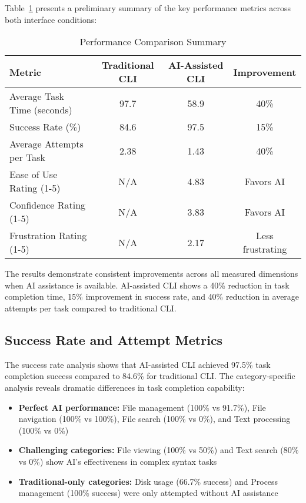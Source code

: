 Table~\ref{tab:results_summary} presents a preliminary summary of the key performance metrics across both interface conditions:

\begin{table}[h]
	\centering
	\caption{Performance Comparison Summary}
	\label{tab:results_summary}
	\begin{tabular}{|l|c|c|c|}
		\hline
		\textbf{Metric}             & \textbf{Traditional CLI} & \textbf{AI-Assisted CLI} & \textbf{Improvement} \\
		\hline
		Average Task Time (seconds) & 97.7                     & 58.9                     & 40\%                 \\
		\hline
		Success Rate (\%)           & 84.6                     & 97.5                     & 15\%                 \\
		\hline
		Average Attempts per Task   & 2.38                     & 1.43                     & 40\%                 \\
		\hline
		Ease of Use Rating (1-5)    & N/A                      & 4.83                     & Favors AI            \\
		\hline
		Confidence Rating (1-5)     & N/A                      & 3.83                     & Favors AI            \\
		\hline
		Frustration Rating (1-5)    & N/A                      & 2.17                     & Less frustrating     \\
		\hline
	\end{tabular}
\end{table}

The results demonstrate consistent improvements across all measured dimensions when AI assistance is available. AI-assisted CLI shows a 40\% reduction in task completion time, 15\% improvement in success rate, and 40\% reduction in average attempts per task compared to traditional CLI.

\subsection{Success Rate and Attempt Metrics}

The success rate analysis shows that AI-assisted CLI achieved 97.5\% task completion success compared to 84.6\% for traditional CLI. The category-specific analysis reveals dramatic differences in task completion capability:

\begin{itemize}
	\item \textbf{Perfect AI performance:} File management (100\% vs 91.7\%), File navigation (100\% vs 100\%), File search (100\% vs 0\%), and Text processing (100\% vs 0\%)
	\item \textbf{Challenging categories:} File viewing (100\% vs 50\%) and Text search (80\% vs 0\%) show AI's effectiveness in complex syntax tasks
	\item \textbf{Traditional-only categories:} Disk usage (66.7\% success) and Process management (100\% success) were only attempted without AI assistance
\end{itemize}

